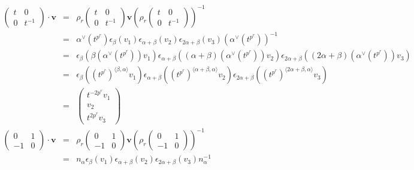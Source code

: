 \begin{eqnarray*}
\left(\begin{matrix} t & 0 \\ 0 & t^{-1}\end{matrix}\right) \cdot \mathbf{v} 
&=&
\rho_r\left(\begin{matrix} t & 0 \\ 0 & t^{-1}\end{matrix}\right) \mathbf{v} \left( \rho_r\left(\begin{matrix} t & 0 \\ 0 & t^{-1}\end{matrix}\right)\right)^{-1} \\
&=& 
\alpha^\vee(t^{p^r}) 
\epsilon_ \beta (v_1)
\epsilon_{\alpha+\beta}(v_2)
\epsilon_{2\alpha+\beta}(v_3) 
(\alpha^\vee(t^{p^r}))^{-1} \\
&=& 
\epsilon_\beta \left(\beta(\alpha^\vee(t^{p^r}))v_1\right)
\epsilon_{\alpha+\beta} \left((\alpha+\beta)(\alpha ^\vee(t^{p^r}))v_2 \right)
\epsilon_{2\alpha+\beta} \left((2\alpha+\beta)(\alpha ^\vee(t^{p^r}))v_3 \right)\\
&=& 
\epsilon_ \beta \left((t^{p^r})^{\langle \beta, \alpha \rangle}v_1 \right)
\epsilon_{\alpha+\beta} \left((t^{p^r})^{\langle \alpha+\beta, \alpha \rangle}v_2 \right)
\epsilon_{2\alpha+\beta} \left((t^{p^r})^{\langle 2\alpha+\beta, \alpha \rangle}v_3 \right)\\
&=& 
\left(\begin{matrix} t^{-2p^r}v_1 \\ v_2\\ t^{2p^r} v_3 \end{matrix}\right) \\
\left(\begin{matrix} 0 & 1 \\ -1 & 0 \end{matrix}\right) \cdot \mathbf{v} 
&=&
\rho_r\left(\begin{matrix} 0 & 1 \\ -1 & 0\end{matrix}\right) \mathbf{v}\left( \rho_r\left(\begin{matrix} 0 & 1 \\ -1 & 0\end{matrix}\right)\right)^{-1} \\
&=& 
n_ \alpha  \epsilon_ \beta (v_1)\epsilon_{\alpha+\beta}(v_2) \epsilon_{2\alpha+\beta}(v_3) n_ \alpha^{-1}\\

\end{eqnarray*}

